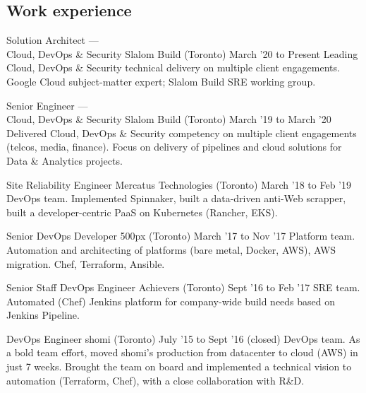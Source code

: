 \documentclass[]{cvpn}
\begin{document}
\cvheader{}

     {\def\gitrev{\unskip}}
     {\def\gitrev{unknown}}
\cvtag{\gitrev}

\begin{multicols}{2}
\section{Work experience}
\begin{eventlist}

\item{Solution Architect ---\\Cloud, DevOps \& Security}
     {Slalom Build (Toronto)}
     {March '20 to Present}
{
Leading Cloud, DevOps \& Security technical
delivery on multiple client engagements.
Google Cloud subject-matter expert;
Slalom Build SRE working group.
}

\eventlink{}

\item{Senior Engineer ---\\Cloud, DevOps \& Security}
     {Slalom Build (Toronto)}
     {March '19 to March '20}
{
Delivered Cloud, DevOps \& Security competency on
multiple client engagements (telcos, media, finance).
Focus on delivery of pipelines and cloud solutions
for Data \& Analytics projects.
}

\item{Site Reliability Engineer}
     {Mercatus Technologies (Toronto)}
     {March '18 to Feb '19}
{
DevOps team.
Implemented Spinnaker,
built a data-driven anti-Web scrapper,
built a developer-centric PaaS on Kubernetes
(Rancher, EKS).
}

\item{Senior DevOps Developer}
     {500px (Toronto)}
     {March '17 to Nov '17}
{
Platform team.
Automation and architecting of platforms
(bare metal, Docker, AWS),
AWS migration. Chef, Terraform, Ansible.
}

\item{Senior Staff DevOps Engineer}
     {Achievers (Toronto)}
     {Sept '16 to Feb '17}
{
SRE team.
Automated (Chef) Jenkins platform for company-wide build
needs based on Jenkins Pipeline.
}

\item{DevOps Engineer}
     {shomi (Toronto)}
     {July '15 to Sept '16 (closed)}
{
DevOps team. As a bold team effort, moved shomi's
production from datacenter to cloud (AWS) in just 7 weeks.
Brought the team on board and implemented a technical
vision to automation (Terraform, Chef),
with a close collaboration with R\&D.
}


\end{eventlist}
\end{multicols}
\end{document}
